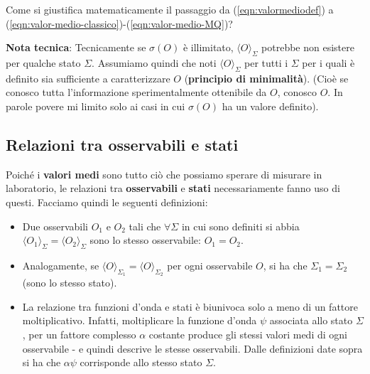 \documentclass[FisicaTeorica.tex]{subfiles}
\begin{document}
\begin{question}
Come si giustifica matematicamente il passaggio da (\ref{eqn:valormediodef}) a (\ref{eqn:valor-medio-classico})-(\ref{eqn:valor-medio-MQ})?
\label{q:giustificazione-prob}
\end{question}
\textbf{Nota tecnica}: Tecnicamente se $\sigma(O)$ è illimitato, $\langle O \rangle_\Sigma$ potrebbe non esistere per qualche stato $\Sigma$. Assumiamo quindi che noti $\langle O \rangle_\Sigma$  per tutti i $\Sigma$ per i quali è definito sia sufficiente a caratterizzare $O$ (\textbf{principio di minimalità}). (Cioè se conosco tutta l'informazione sperimentalmente ottenibile da $O$, conosco $O$. In parole povere mi limito solo ai casi in cui $\sigma(O)$ ha un valore definito).

\subsection{Relazioni tra osservabili e stati}
Poiché i \textbf{valori medi} sono tutto ciò che possiamo sperare di misurare in laboratorio, le relazioni tra \textbf{osservabili} e \textbf{stati} necessariamente fanno uso di questi. Facciamo quindi le seguenti definizioni:
\begin{itemize}
    \item Due osservabili   $O_1$ e $O_2$ tali che $\forall \Sigma$ in cui sono definiti si abbia $\langle O_1 \rangle_\Sigma = \langle O_2 \rangle_\Sigma$ sono lo stesso osservabile: $O_1 = O_2$.
    \item Analogamente,  se $\langle O \rangle_{\Sigma_1} = \langle O \rangle_{\Sigma_2}$ per ogni osservabile $O$, si ha che $\Sigma_1 = \Sigma_2$ (sono lo stesso stato).
    \item La relazione tra funzioni d'onda e stati è biunivoca solo a meno di un fattore moltiplicativo. Infatti, moltiplicare la funzione d'onda $\psi$ associata allo stato $\Sigma$, per un fattore complesso $\alpha$ costante produce gli stessi valori medi di ogni osservabile - e quindi descrive le stesse osservabili. Dalle definizioni date sopra si ha che $\alpha \psi$ corrisponde allo stesso stato $\Sigma$.
\end{itemize}
\end{document}
